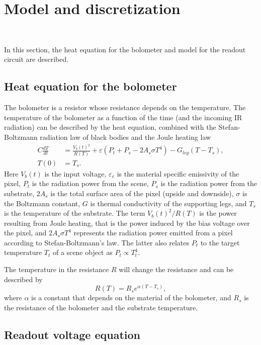 \section{Model and discretization}~\label{sec:model_disc}

In this section, the heat equation for the bolometer and model for the
readout circuit are described.

\subsection{Heat equation for the bolometer}

The bolometer is a resistor whose resistance depends on the temperature.
The temperature of the bolometer as a function of the time (and the
incoming IR radiation) can be described by the heat equation, combined
with the Stefan-Boltzmann radiation law of black bodies and the Joule heating law
\begin{align} \label{eq:heat_balance_equation}
 C\frac{dT}{dt}&=\frac{V_b(t)^2}{R(T)}+\varepsilon(P_t+P_s -2A_s \sigma T^4)-G_{leg}(T-T_s), \\
 T(0)&=T_s.	\nonumber
\end{align}
Here $V_b(t)$ is the input voltage, $\varepsilon_e$ is the material
specific emissivity of the pixel, $P_t$ is the radiation power from
the scene, $P_s$ is the radiation power from the substrate, $2A_s$ is
the total surface area of the pixel (upside and downside), $\sigma$ is the Boltzmann constant, $G$
is thermal conductivity of the supporting legs, and $T_s$ is the
temperature of the substrate. The term
$V_b(t)^2/R(T)$ is the power resulting from Joule heating, that is
the power induced by the bias voltage over
the pixel, and $2A_s \sigma T^4$ represents the radiation power
emitted from a pixel according to Stefan-Boltzmann's law. The
latter also relates $P_t$ to the target temperature $T_t$ of a scene
object as $P_t \propto T_t^4$.

The temperature in the resistance $R$ will change the resistance and
can be described by~\cite{xiu2010research}
\begin{equation}
  \label{eq:resistance_temperature}
  R(T)=R_s e^{\alpha(T-T_s)},
\end{equation}
where $\alpha$ is a constant that depends on the material of the
bolometer, and $R_s$ is the resistance of the bolometer and the
substrate temperature.

\subsection{Readout voltage equation}


